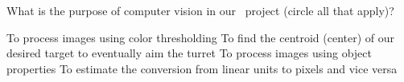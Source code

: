\documentclass[addpoints,noanswers]{exam}
\begin{document}
\begin{questions}
\question[1]
What is the purpose of computer vision in our \usnaCourseNumber\ project (circle all that apply)?
\begin{choices}
\choice To process images using color thresholding
\CorrectChoice To find the centroid (center) of our desired target to eventually aim the turret
\choice To process images using object properties
\choice To estimate the conversion from linear units to pixels and vice versa
\end{choices}

\end{questions}
\end{document}
